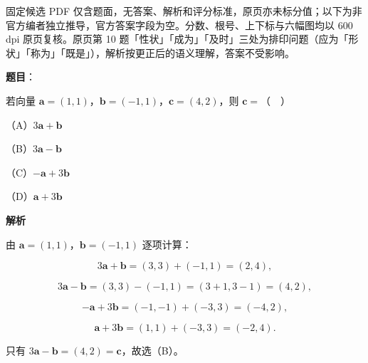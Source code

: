 

\begin{gktip}
固定候选 PDF 仅含题面，无答案、解析和评分标准，原页亦未标分值；以下为非官方编者独立推导，官方答案字段为空。分数、根号、上下标与六幅图均以 600 dpi 原页复核。原页第 10 题「性状」「成为」「及时」三处为排印问题（应为「形状」「称为」「既是」），解析按更正后的语义理解，答案不受影响。
\end{gktip}

\begin{answer}

\textbf{题目}：

若向量 $\boldsymbol a=(1,1)$，$\boldsymbol b=(-1,1)$，$\boldsymbol c=(4,2)$，则 $\boldsymbol c=$（　）

（A）$3\boldsymbol a+\boldsymbol b$

（B）$3\boldsymbol a-\boldsymbol b$

（C）$-\boldsymbol a+3\boldsymbol b$

（D）$\boldsymbol a+3\boldsymbol b$

\textbf{解析}

由 $\boldsymbol a=(1,1)$，$\boldsymbol b=(-1,1)$ 逐项计算：

\nopagebreak[4]
\[3\boldsymbol a+\boldsymbol b=(3,3)+(-1,1)=(2,4),\]

\nopagebreak[4]
\[3\boldsymbol a-\boldsymbol b=(3,3)-(-1,1)=(3+1,3-1)=(4,2),\]

\nopagebreak[4]
\[-\boldsymbol a+3\boldsymbol b=(-1,-1)+(-3,3)=(-4,2),\]

\nopagebreak[4]
\[\boldsymbol a+3\boldsymbol b=(1,1)+(-3,3)=(-2,4).\]

只有 $3\boldsymbol a-\boldsymbol b=(4,2)=\boldsymbol c$，故选（B）。


\end{answer}
